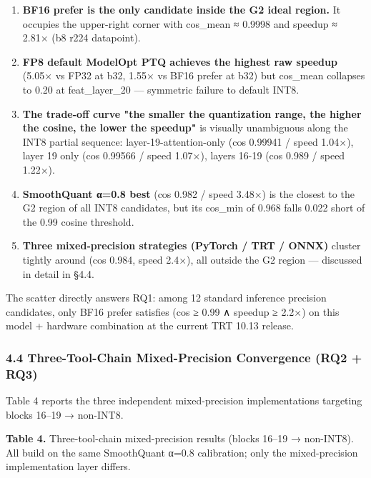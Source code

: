 \documentclass[
]{article}
\providecommand{\tightlist}{%
  \setlength{\itemsep}{0pt}\setlength{\parskip}{0pt}}
\begin{document}
\begin{enumerate}
\def\labelenumi{\arabic{enumi}.}
\tightlist
\item
  \textbf{BF16 prefer is the only candidate inside the G2 ideal region.}
  It occupies the upper-right corner with cos\_mean ≈ 0.9998 and speedup
  ≈ 2.81× (b8 r224 datapoint).
\item
  \textbf{FP8 default ModelOpt PTQ achieves the highest raw speedup}
  (5.05× vs FP32 at b32, 1.55× vs BF16 prefer at b32) but cos\_mean
  collapses to 0.20 at feat\_layer\_20 --- symmetric failure to default
  INT8.
\item
  \textbf{The trade-off curve "the smaller the quantization range, the
  higher the cosine, the lower the speedup"} is visually unambiguous
  along the INT8 partial sequence: layer-19-attention-only (cos 0.99941
  / speed 1.04×), layer 19 only (cos 0.99566 / speed 1.07×), layers
  16-19 (cos 0.989 / speed 1.22×).
\item
  \textbf{SmoothQuant α=0.8 best} (cos 0.982 / speed 3.48×) is the
  closest to the G2 region of all INT8 candidates, but its cos\_min of
  0.968 falls 0.022 short of the 0.99 cosine threshold.
\item
  \textbf{Three mixed-precision strategies (PyTorch / TRT / ONNX)}
  cluster tightly around (cos 0.984, speed 2.4×), all outside the G2
  region --- discussed in detail in §4.4.
\end{enumerate}

The scatter directly answers RQ1: among 12 standard inference precision
candidates, only BF16 prefer satisfies (cos ≥ 0.99 ∧ speedup ≥ 2.2×) on
this model + hardware combination at the current TRT 10.13 release.

\subsubsection{4.4 Three-Tool-Chain Mixed-Precision Convergence (RQ2 +
RQ3)}\label{44-three-tool-chain-mixed-precision-convergence-rq2--rq3}

Table 4 reports the three independent mixed-precision implementations
targeting blocks 16--19 → non-INT8.

\textbf{Table 4.} Three-tool-chain mixed-precision results (blocks
16--19 → non-INT8). All build on the same SmoothQuant α=0.8 calibration;
only the mixed-precision implementation layer differs.
\end{document}
